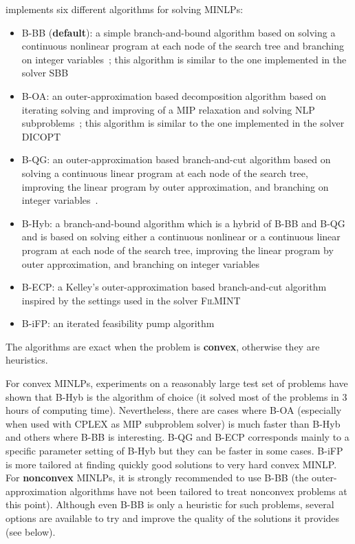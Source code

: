 \BONMIN implements six different algorithms for solving MINLPs:
\begin{itemize}
\setlength{\partopsep}{0pt}
\setlength{\itemsep}{0pt}
\item {B-BB} (\textbf{default}): a simple branch-and-bound algorithm based on solving a continuous nonlinear program at each node of the search tree and branching on integer variables~\cite{GuptaRavindran85}; this algorithm is similar to the one implemented in the solver \textsc{SBB}
\item {B-OA}: an outer-approximation based decomposition algorithm based on iterating solving and improving of a MIP relaxation and solving NLP subproblems~\cite{DuGr86,FlLe94}; this algorithm is similar to the one implemented in the solver \textsc{DICOPT}
\item {B-QG}: an outer-approximation based branch-and-cut algorithm based on solving a continuous linear program at each node of the search tree, improving the linear program by outer approximation, and branching on integer variables~\cite{QeGr92}.
\item {B-Hyb}: a branch-and-bound algorithm which is a hybrid of B-BB and B-QG and is based on solving either a continuous nonlinear or a continuous linear program at each node of the search tree, improving the linear program by outer approximation, and branching on integer variables~\cite{BBCCGLLLMSW}
\item {B-ECP}: a Kelley's outer-approximation based branch-and-cut algorithm inspired by the settings used in the solver \textsc{FilMINT}~\cite{AbLeLi07}
\item {B-iFP}: an iterated feasibility pump algorithm~\cite{BoCoLoMa06}
\end{itemize}
The algorithms are exact when the problem is \textbf{convex}, otherwise they are heuristics.

For convex MINLPs, experiments on a reasonably large test set of problems have shown that B-Hyb is the algorithm of choice (it solved most of the problems in 3 hours of computing time).
Nevertheless, there are cases where B-OA (especially when used with CPLEX as MIP subproblem solver) is much faster than B-Hyb and others where B-BB is interesting.
B-QG and B-ECP corresponds mainly to a specific parameter setting of B-Hyb but they can be faster in some cases.
B-iFP is more tailored at finding quickly good solutions to very hard convex MINLP.
For \textbf{nonconvex} MINLPs, it is strongly recommended to use B-BB (the outer-approximation algorithms have not been tailored to treat nonconvex problems at this point).
Although even B-BB is only a heuristic for such problems, several options are available to try and improve the quality of the solutions it provides (see below).

